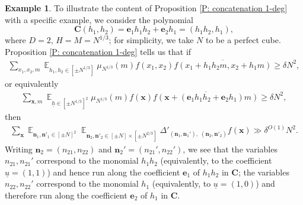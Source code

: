 \documentclass[11pt]{amsart}
\theoremstyle{definition}
\newtheorem{example}[lemma]{Example} %
\DeclareMathOperator*{\E}{\mathbb{E}}
\newcommand{\bc}{{\mathbf{C}}}
\newcommand{\bn}{{\mathbf{n}}}
\newcommand{\be}{{\mathbf{e}}}
\newcommand{\bx}{{\mathbf{x}}}
\newcommand{\uh}{{\underline{h}}}
\newcommand{\uu}{{\underline{u}}}
\begin{document}
\begin{example}\label{E: example of 1-deg concatenation}
To illustrate the content of Proposition \ref{P: concatenation 1-deg} with a specific example, we consider the polynomial $$\bc(h_1, h_2) = \be_1h_1 h_2 + \be_2 h_1 = (h_1 h_2, h_1),$$
where $D = 2$, $H=M=N^{1/3}$; for simplicity, we take $N$ to be a perfect cube.
Proposition \ref{P: concatenation 1-deg} tells us that if
\begin{align*}
    \sum_{x_1, x_2, m} \E_{h_1, h_2\in[\pm N^{1/3}]} \mu_{N^{1/3}}(m) f(x_1, x_2) \overline{f(x_1 + h_1h_2m, x_2 +h_1 m)}\geq \delta N^2,
\end{align*}
or equivalently
\begin{align*}
    \sum_{\bx, m}\E_{\uh\in[\pm N^{1/3}]^2} \mu_{N^{1/3}}(m) f(\bx)\overline{f(\bx + (\be_1h_1h_2 + \be_2 h_1)m)}\geq \delta N^2,
\end{align*}
then
\begin{align*}
    \sum_{\bx}\E_{\bn_1, \bn'_1\in[\pm N]^2}\E_{\bn_2, \bn'_2\in[\pm N]\times [\pm N^{2/3}]} \Delta'_{(\bn_1,\bn_1'),\; (\bn_2, \bn'_2)}f(\bx)\gg \delta^{O(1)}N^{2}.
\end{align*}
Writing $\bn_2 = (n_{21}, n_{22})$ and $\bn_2'=(n_{21}', n_{22}')$, we see that the variables $n_{21}, n_{21}'$ correspond to the monomial $h_1 h_2$ (equivalently, to the coefficient $\uu = (1,1)$) and hence run along the coefficient $\be_1$ of $h_1h_2$ in $\bc$; the variables $n_{22}, n_{22}'$ correspond to the monomial $h_1$ (equivalently, to $\uu = (1,0)$) and therefore run along the coefficient $\be_2$ of $h_1$ in $\bc$.
\end{example}
\end{document}
